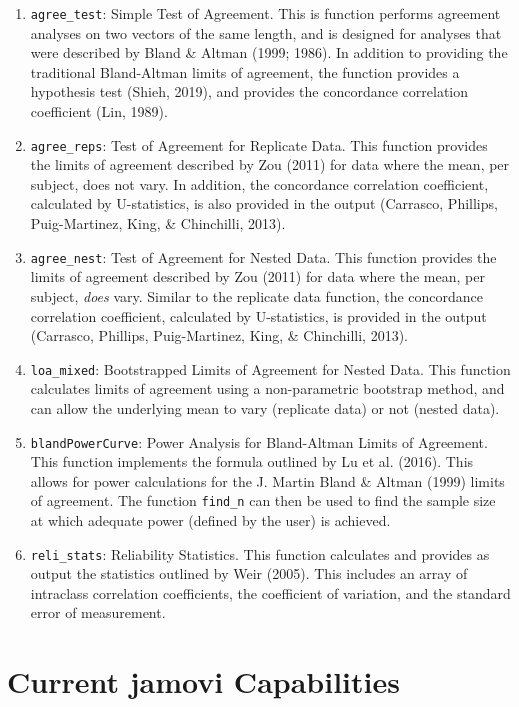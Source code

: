 \documentclass[
]{article}
\begin{document}
\begin{enumerate}
\def\labelenumi{\arabic{enumi}.}
\item
  \texttt{agree\_test}: Simple Test of Agreement. This is function
  performs agreement analyses on two vectors of the same length, and is
  designed for analyses that were described by Bland \& Altman (1999;
  1986). In addition to providing the traditional Bland-Altman limits of
  agreement, the function provides a hypothesis test (Shieh, 2019), and
  provides the concordance correlation coefficient (Lin, 1989).
\item
  \texttt{agree\_reps}: Test of Agreement for Replicate Data. This
  function provides the limits of agreement described by Zou (2011) for
  data where the mean, per subject, does not vary. In addition, the
  concordance correlation coefficient, calculated by U-statistics, is
  also provided in the output (Carrasco, Phillips, Puig-Martinez, King,
  \& Chinchilli, 2013).
\item
  \texttt{agree\_nest}: Test of Agreement for Nested Data. This function
  provides the limits of agreement described by Zou (2011) for data
  where the mean, per subject, \emph{does} vary. Similar to the
  replicate data function, the concordance correlation coefficient,
  calculated by U-statistics, is provided in the output (Carrasco,
  Phillips, Puig-Martinez, King, \& Chinchilli, 2013).
\item
  \texttt{loa\_mixed}: Bootstrapped Limits of Agreement for Nested Data.
  This function calculates limits of agreement using a non-parametric
  bootstrap method, and can allow the underlying mean to vary (replicate
  data) or not (nested data).
\item
  \texttt{blandPowerCurve}: Power Analysis for Bland-Altman Limits of
  Agreement. This function implements the formula outlined by Lu et al.
  (2016). This allows for power calculations for the J. Martin Bland \&
  Altman (1999) limits of agreement. The function \texttt{find\_n} can
  then be used to find the sample size at which adequate power (defined
  by the user) is achieved.
\item
  \texttt{reli\_stats}: Reliability Statistics. This function calculates
  and provides as output the statistics outlined by Weir (2005). This
  includes an array of intraclass correlation coefficients, the
  coefficient of variation, and the standard error of measurement.
\end{enumerate}

\hypertarget{current-jamovi-capabilities}{%
\section{Current jamovi
Capabilities}\label{current-jamovi-capabilities}}
\end{document}
